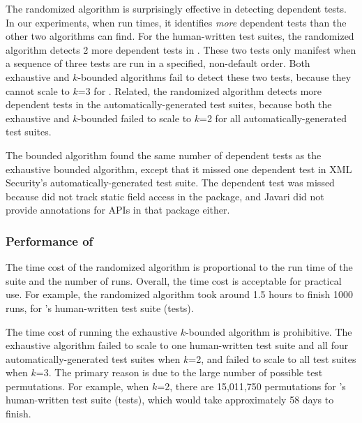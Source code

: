 The randomized algorithm is surprisingly effective in
detecting dependent tests. In our experiments, when run \trialnum times,
it identifies \textit{more} dependent tests than the other
two algorithms can find. For the human-written
test suites, the randomized algorithm detects 2 more dependent
tests in \jt. These two tests only
manifest when a sequence of three tests are run in a specified,
non-default order. Both exhaustive and \dependenceaware{} $k$-bounded
algorithms fail to detect these two tests, because
they cannot scale to $k$=3 for 
\jt. Related, the randomized algorithm
detects more dependent
tests in the automatically-generated test suites,
because both the exhaustive and \dependenceaware{} $k$-bounded
failed to scale to $k$=2 for all automatically-generated test suites.

The \dependenceaware{} bounded algorithm found the same
number of dependent tests as the exhaustive bounded algorithm, except
that it missed one dependent test in XML Security's
automatically-generated test suite.
The dependent test was missed because \ourtool
did not track static field access in the  package,
and Javari did not provide annotations for APIs
in that package either.


\subsubsection{Performance of \ourtool}
\label{sec:performance}

The time cost of the randomized algorithm 
is proportional to the run time of the suite and the number of runs.
Overall, the time cost is acceptable for practical use.
For example, the randomized algorithm took around 1.5 hours
to finish 1000 runs,  for \jt's human-written test
suite (\jodatimetests tests).
 
The time cost of running the exhaustive $k$-bounded algorithm
is prohibitive. The exhaustive algorithm failed to
scale to one human-written test suite and all four automatically-generated
test suites when $k$=2, and failed to scale to all test suites
when $k$=3. The primary reason is due to the large
number of possible test permutations. 
For example, when $k$=2, there are 15,011,750 permutations
for \jt's human-written test suite (\jodatimetests tests),
which would take approximately 58 days to finish.

